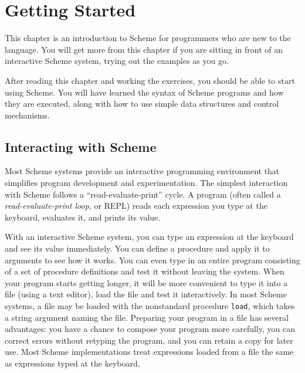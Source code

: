 \chapter{Getting Started\label{start_CHPTGETTINGSTARTED}}
\label{start_g4}
\label{start_h0}
\begin{figure}[H]
\centering
\setlength{\fboxrule}{3pt}
\end{figure}
\clearpage





This chapter is an introduction to Scheme for programmers who are new
to the language.
You will get more from this chapter if you are sitting in front of an
interactive Scheme system, trying out the examples as you go.


After reading this chapter and working the exercises, you should be
able to start using Scheme.
You will have learned the syntax of Scheme programs and how they are
executed, along with how to use simple data structures and control
mechanisms.



\section{\label{start_g5}\label{start_h1}Interacting with Scheme\label{start_SECTGSINTERACTING}}



Most Scheme systems provide an interactive programming environment
that simplifies program development and experimentation.
The simplest interaction with Scheme follows a ``read-evaluate-print''
cycle.
A program (often called a \textit{read-evaluate-print loop}, or REPL)
reads each expression you type at the keyboard,
evaluates it, and prints its value.


With an interactive Scheme system, you can type an expression at 
the keyboard and see its value immediately.
You can define a procedure and apply it to arguments to see how it works. 
You can even type in an entire program consisting of a set of procedure 
definitions and test it without leaving the system.
When your program starts getting longer, it will be more convenient to 
type it into a file (using a text editor), load the file
and test it interactively.
In most Scheme systems, a file may be loaded with the nonstandard
procedure \label{start_s0}\texttt{load}, which takes a string
argument naming the file.
Preparing your program in a file has several advantages: you have a 
chance to compose your program more carefully, you can correct errors 
without retyping the program, and you can retain a copy for later use.
Most Scheme implementations treat expressions loaded from a file the same as expressions 
typed at the keyboard.


